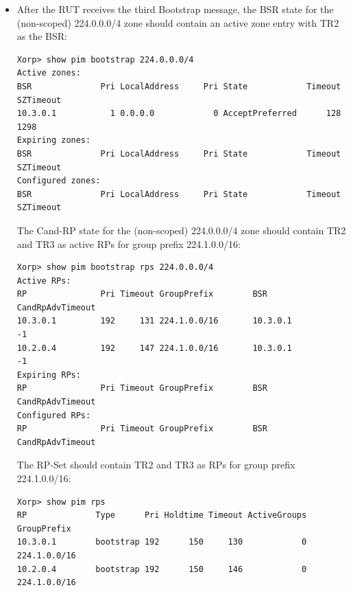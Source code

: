 \documentclass[11pt]{report}
\begin{document}
\begin{itemize}
  \item After the RUT receives the third Bootstrap message, the BSR state for
  the (non-scoped) 224.0.0.0/4 zone should contain an active zone entry with
  TR2 as the BSR:

\begin{verbatim}
Xorp> show pim bootstrap 224.0.0.0/4
Active zones:
BSR              Pri LocalAddress     Pri State            Timeout SZTimeout
10.3.0.1           1 0.0.0.0            0 AcceptPreferred      128      1298
Expiring zones:
BSR              Pri LocalAddress     Pri State            Timeout SZTimeout
Configured zones:
BSR              Pri LocalAddress     Pri State            Timeout SZTimeout
\end{verbatim}

  The Cand-RP state for the (non-scoped) 224.0.0.0/4 zone should
  contain TR2 and TR3 as active RPs for group prefix 224.1.0.0/16:

\begin{verbatim}
Xorp> show pim bootstrap rps 224.0.0.0/4
Active RPs:
RP               Pri Timeout GroupPrefix        BSR         CandRpAdvTimeout
10.3.0.1         192     131 224.1.0.0/16       10.3.0.1                  -1
10.2.0.4         192     147 224.1.0.0/16       10.3.0.1                  -1
Expiring RPs:
RP               Pri Timeout GroupPrefix        BSR         CandRpAdvTimeout
Configured RPs:
RP               Pri Timeout GroupPrefix        BSR         CandRpAdvTimeout
\end{verbatim}

  The RP-Set should contain TR2 and TR3 as RPs for group prefix 224.1.0.0/16:

\begin{verbatim}
Xorp> show pim rps 
RP              Type      Pri Holdtime Timeout ActiveGroups GroupPrefix       
10.3.0.1        bootstrap 192      150     130            0 224.1.0.0/16      
10.2.0.4        bootstrap 192      150     146            0 224.1.0.0/16      
\end{verbatim}

\end{itemize}

\end{document}
